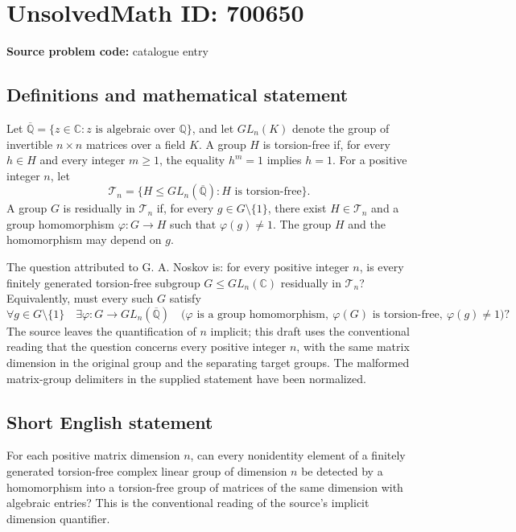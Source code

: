 \documentclass[11pt]{article}
\newcommand{\Q}{\mathbb{Q}}
\newcommand{\C}{\mathbb{C}}
\begin{document}
\section*{UnsolvedMath ID: 700650}
\textbf{Source problem code:} catalogue entry
\subsection{Definitions and mathematical statement}
Let \(\overline{\Q}=\{z\in\C:z\text{ is algebraic over }\Q\}\), and let \(GL_n(K)\) denote the group of invertible \(n\times n\) matrices over a field \(K\). A group \(H\) is torsion-free if, for every \(h\in H\) and every integer \(m\geq 1\), the equality \(h^m=1\) implies \(h=1\). For a positive integer \(n\), let
\[
\mathcal{T}_n=\{H\leq GL_n(\overline{\Q}):H\text{ is torsion-free}\}.
\]
A group \(G\) is residually in \(\mathcal{T}_n\) if, for every \(g\in G\setminus\{1\}\), there exist \(H\in\mathcal{T}_n\) and a group homomorphism \(\varphi:G\to H\) such that \(\varphi(g)\neq 1\). The group \(H\) and the homomorphism may depend on \(g\).

The question attributed to G. A. Noskov is: for every positive integer \(n\), is every finitely generated torsion-free subgroup \(G\leq GL_n(\C)\) residually in \(\mathcal{T}_n\)? Equivalently, must every such \(G\) satisfy
\[
\forall g\in G\setminus\{1\}\quad
\exists\varphi:G\longrightarrow GL_n(\overline{\Q})
\quad\bigl(\varphi\text{ is a group homomorphism},\ 
\varphi(G)\text{ is torsion-free},\ 
\varphi(g)\neq 1\bigr)?
\]
The source leaves the quantification of \(n\) implicit; this draft uses the conventional reading that the question concerns every positive integer \(n\), with the same matrix dimension in the original group and the separating target groups. The malformed matrix-group delimiters in the supplied statement have been normalized.
\subsection{Short English statement}
For each positive matrix dimension \(n\), can every nonidentity element of a finitely generated torsion-free complex linear group of dimension \(n\) be detected by a homomorphism into a torsion-free group of matrices of the same dimension with algebraic entries? This is the conventional reading of the source's implicit dimension quantifier.
\end{document}
